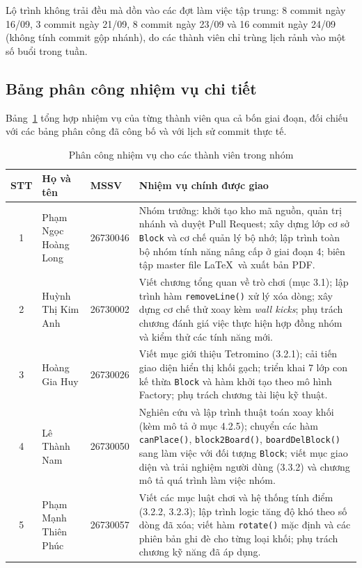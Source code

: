 Lộ trình không trải đều mà dồn vào các đợt làm việc tập trung: 8 commit ngày 16/09, 3 commit ngày 21/09, 8 commit ngày 23/09 và 16 commit ngày 24/09 (không tính commit gộp nhánh), do các thành viên chỉ trùng lịch rảnh vào một số buổi trong tuần.

\subsection{Bảng phân công nhiệm vụ chi tiết}

Bảng~\ref{tab:phan_cong_nhiem_vu} tổng hợp nhiệm vụ của từng thành viên qua cả bốn giai đoạn, đối chiếu với các bảng phân công đã công bố và với lịch sử commit thực tế.

\begin{table}[H]
    \centering
    \caption{Phân công nhiệm vụ cho các thành viên trong nhóm}
    \label{tab:phan_cong_nhiem_vu}
    \renewcommand{\arraystretch}{1.35}
    \begin{tabularx}{\textwidth}{|c|p{3.4cm}|p{1.9cm}|X|}
        \hline
        \textbf{STT} & \textbf{Họ và tên} & \textbf{MSSV} & \textbf{Nhiệm vụ chính được giao} \\
        \hline
        1 & Phạm Ngọc Hoàng Long & 26730046 & Nhóm trưởng: khởi tạo kho mã nguồn, quản trị nhánh và duyệt Pull Request; xây dựng lớp cơ sở \texttt{Block} và cơ chế quản lý bộ nhớ; lập trình toàn bộ nhóm tính năng nâng cấp ở giai đoạn 4; biên tập master file \LaTeX\ và xuất bản PDF. \\
        \hline
        2 & Huỳnh Thị Kim Anh & 26730002 & Viết chương tổng quan về trò chơi (mục 3.1); lập trình hàm \texttt{removeLine()} xử lý xóa dòng; xây dựng cơ chế thử xoay kèm \textit{wall kicks}; phụ trách chương đánh giá việc thực hiện hợp đồng nhóm và kiểm thử các tính năng mới. \\
        \hline
        3 & Hoàng Gia Huy & 26730026 & Viết mục giới thiệu Tetromino (3.2.1); cải tiến giao diện hiển thị khối gạch; triển khai 7 lớp con kế thừa \texttt{Block} và hàm khởi tạo theo mô hình Factory; phụ trách chương tài liệu kỹ thuật. \\
        \hline
        4 & Lê Thành Nam & 26730050 & Nghiên cứu và lập trình thuật toán xoay khối (kèm mô tả ở mục 4.2.5); chuyển các hàm \texttt{canPlace()}, \texttt{block2Board()}, \texttt{boardDelBlock()} sang làm việc với đối tượng \texttt{Block}; viết mục giao diện và trải nghiệm người dùng (3.3.2) và chương mô tả quá trình làm việc nhóm. \\
        \hline
        5 & Phạm Mạnh Thiên Phúc & 26730057 & Viết các mục luật chơi và hệ thống tính điểm (3.2.2, 3.2.3); lập trình logic tăng độ khó theo số dòng đã xóa; viết hàm \texttt{rotate()} mặc định và các phiên bản ghi đè cho từng loại khối; phụ trách chương kỹ năng đã áp dụng. \\
        \hline
    \end{tabularx}
\end{table}

